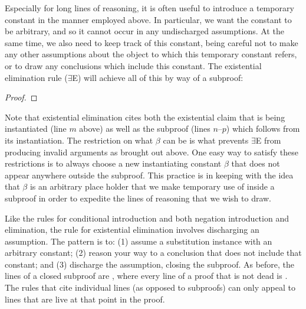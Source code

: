 Especially for long lines of reasoning, it is often useful to introduce a temporary constant in the manner employed above.
In particular, we want the constant to be arbitrary, and so it cannot occur in any undischarged assumptions.
At the same time, we also need to keep track of this constant, being careful not to make any other assumptions about the object to which this temporary constant refers, or to draw any conclusions which include this constant.
The existential elimination rule ($\exists$E) will achieve all of this by way of a subproof:

\begin{proof}
	\open	
     
     
	\close
	 
\end{proof}

Note that existential elimination cites both the existential claim that is being instantiated (line $m$ above) as well as the subproof (lines $n$--$p$) which follows from its instantiation.
The restriction on what $\beta$ can be is what prevents $\exists$E from producing invalid arguments as brought out above. 
One easy way to satisfy these restrictions is to always choose a new instantiating constant $\beta$ that does not appear anywhere outside the subproof. 
This practice is in keeping with the idea that $\beta$ is an arbitrary place holder that we make temporary use of inside a subproof in order to expedite the lines of reasoning that we wish to draw.

Like the rules for conditional introduction and both negation introduction and elimination, the rule for existential elimination involves discharging an assumption.
The pattern is to: (1) assume a substitution instance with an arbitrary constant; (2) reason your way to a conclusion that does not include that constant; and (3) discharge the assumption, closing the subproof.
As before, the lines of a closed subproof are , where every line of a proof that is not dead is .
The rules that cite individual lines (as opposed to subproofs) can only appeal to lines that are live at that point in the proof.

